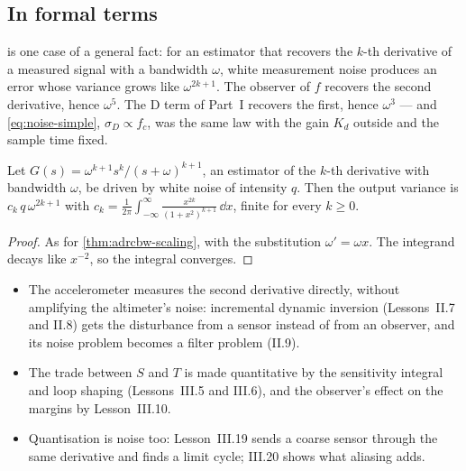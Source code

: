 \subsection{In formal terms}
 is one case of a general fact: for an estimator that recovers the $k$-th derivative of a measured signal with a bandwidth $\omega$, white measurement noise produces an error whose variance grows like $\omega^{2k+1}$. The observer of $f$ recovers the second derivative, hence $\omega^5$. The D term of Part~I recovers the first, hence $\omega^3$ — and \cref{eq:noise-simple}, $\sigma_D \propto f_c$, was the same law with the gain $K_d$ outside and the sample time fixed.

\begin{theorem}
\label{thm:adrcbw-derivative}
Let $G(s) = \omega^{k+1}s^k/(s + \omega)^{k+1}$, an estimator of the $k$-th derivative with bandwidth $\omega$, be driven by white noise of intensity $q$. Then the output variance is $c_k\,q\,\omega^{2k+1}$ with $c_k = \frac{1}{2\pi}\int_{-\infty}^\infty \frac{x^{2k}}{(1 + x^2)^{k+1}}\,\dd x$, finite for every $k \ge 0$.
\end{theorem}
\begin{proof}
As for \cref{thm:adrcbw-scaling}, with the substitution $\omega' = \omega x$. The integrand decays like $x^{-2}$, so the integral converges.
\end{proof}

\begin{lookahead}
\begin{itemize}[leftmargin=1.2em]
  \item The accelerometer measures the second derivative directly, without amplifying the altimeter's noise: incremental dynamic inversion (Lessons~II.7 and II.8) gets the disturbance from a sensor instead of from an observer, and its noise problem becomes a filter problem (II.9).
  \item The trade between $S$ and $T$ is made quantitative by the sensitivity integral and loop shaping (Lessons~III.5 and III.6), and the observer's effect on the margins by Lesson~III.10.
  \item Quantisation is noise too: Lesson~III.19 sends a coarse sensor through the same derivative and finds a limit cycle; III.20 shows what aliasing adds.
\end{itemize}
\end{lookahead}

